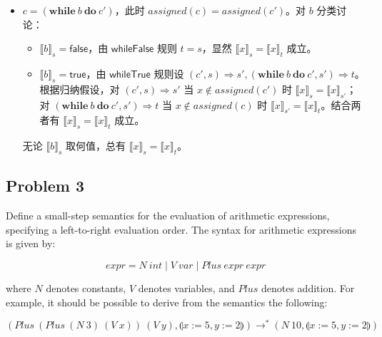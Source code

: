 \documentclass[UTF8]{ctexart}
\begin{document}
\begin{itemize}
        \item $c=(\mathbf{while}\ b\ \mathbf{do}\ c')$，此时 $assigned(c)=assigned(c')$。对 $b$ 分类讨论：\begin{itemize}
            \item ${\llbracket b \rrbracket}_s=\mathsf{false}$，由 $\mathsf{whileFalse}$ 规则 $t=s$，显然 ${\llbracket x \rrbracket}_s = {\llbracket x \rrbracket}_t$ 成立。
            \item ${\llbracket b \rrbracket}_s=\mathsf{true}$，由 $\mathsf{whileTrue}$ 规则设 $(c', s) \Rightarrow s', (\mathbf{while}\ b\ \mathbf{do}\ c', s') \Rightarrow t$。根据归纳假设，对 $(c', s) \Rightarrow s'$ 当 $x \notin assigned(c')$ 时 ${\llbracket x \rrbracket}_s = {\llbracket x \rrbracket}_{s'}$；对 $(\mathbf{while}\ b\ \mathbf{do}\ c', s') \Rightarrow t$ 当 $x \notin assigned(c)$ 时 ${\llbracket x \rrbracket}_{s'} = {\llbracket x \rrbracket}_t$。结合两者有 ${\llbracket x \rrbracket}_s = {\llbracket x \rrbracket}_t$ 成立。
        \end{itemize}
        无论 ${\llbracket b \rrbracket}_s$ 取何值，总有 ${\llbracket x \rrbracket}_s = {\llbracket x \rrbracket}_t$。
    \end{itemize}

    \subsection*{Problem 3}

    \begin{framed}
        Define a small-step semantics for the evaluation of arithmetic expressions, specifying a left-to-right evaluation order. The syntax for arithmetic expressions is given by:

        $$
            expr = N\ int \mid V\ var \mid Plus\ expr\ expr
        $$

        where $N$ denotes constants, $V$ denotes variables, and $Plus$ denotes addition. For example, it should be possible to derive from the semantics the following:

        $$
            (Plus\ (Plus\ (N\ 3)\ (V\ x))\ (V\ y), \llparenthesis x:=5, y:=2 \rrparenthesis) \to^{\ast} (N\ 10, \llparenthesis x:=5, y:=2 \rrparenthesis)
        $$
    \end{framed}
\end{document}
